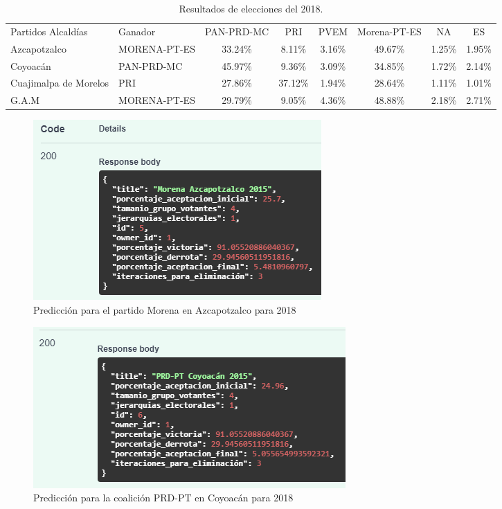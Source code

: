 \begin{table}[h]
\centering
\resizebox{15cm}{!} {
\begin{tabular}{m{2.5cm}m{3cm}cccccc}
\rowcolor[HTML]{3166FF} 
{\color[HTML]{FFFFFF} Partidos \newline Alcaldías} & {\color[HTML]{FFFFFF} Ganador} & {\color[HTML]{FFFFFF} PAN-PRD-MC} & {\color[HTML]{FFFFFF} PRI} & {\color[HTML]{FFFFFF} PVEM} & {\color[HTML]{FFFFFF} Morena-PT-ES} & {\color[HTML]{FFFFFF} NA} & {\color[HTML]{FFFFFF} ES} \\
Azcapotzalco & MORENA-PT-ES & 33.24\% & 8.11\% & 3.16\% & 49.67\% & 1.25\% & 1.95\% \\
Coyoacán & PAN-PRD-MC & 45.97\% & 9.36\% & 3.09\% & 34.85\% & 1.72\% & 2.14\% \\
Cuajimalpa de Morelos & PRI & 27.86\% & 37.12\% & 1.94\% & 28.64\% & 1.11\%& 1.01\% \\
G.A.M & MORENA-PT-ES & 29.79\% & 9.05\% & 4.36\% & 48.88\% & 2.18\% & 2.71\%
\end{tabular}
}
\caption{Resultados de elecciones del 2018. \cite{IECM2018}}
\label{table:Elecciones 2018}
\end{table}

\begin{figure}[!htb]
    \centering
    \includegraphics[scale=.5]{TT/img/pruebas/Morena Azcapotzalco 2015.png}
    \caption{Predicción para el partido Morena en Azcapotzalco para 2018}
    \label{graphic:MORENAAZC2015}
\end{figure}

\begin{figure}[!htb]
    \centering
    \includegraphics[scale=.5]{TT/img/pruebas/PRD-PT Coyoacan 2015.png}
    \caption{Predicción para la coalición PRD-PT en Coyoacán para 2018}
    \label{graphic:PRDPTCOY2015}
\end{figure}

